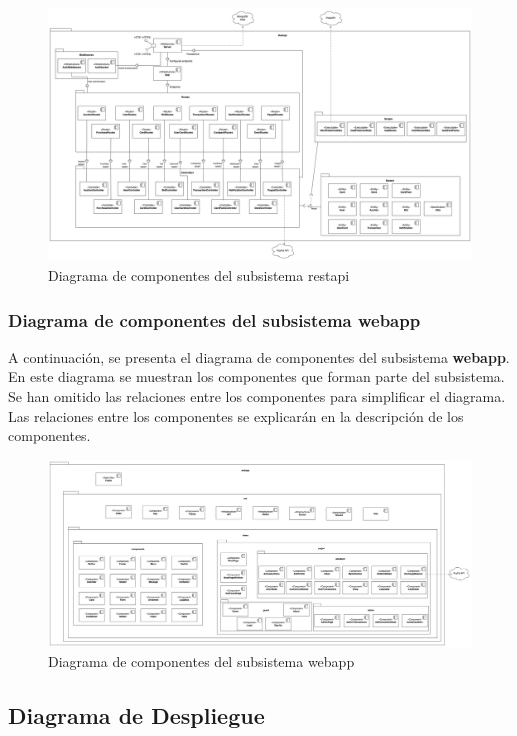     \begin{landscape}
    \begin{figure}[H]
        \hypertarget{fig:6_5_Diagrama-Componentes-restapi}{}
        \centering
        \includegraphics[width=1\linewidth]{figures/6-Analisis/6-Clases/6_5-Componentes-restapi.png}
        \caption{Diagrama de componentes del subsistema restapi}
        \label{fig:6_5_Diagrama-Componentes-restapi}
    \end{figure}
    \end{landscape}

\newpage




\subsubsection{Diagrama de componentes del subsistema webapp}
A continuación, se presenta el diagrama de componentes del subsistema \textbf{webapp}. En este diagrama se muestran los componentes que forman parte del subsistema.
Se han omitido las relaciones entre los componentes para simplificar el diagrama. Las relaciones entre los componentes se explicarán en la descripción de los componentes.
\begin{landscape}
    \begin{figure}[H]
        \hypertarget{fig:6_5_Diagrama-Componentes-webapp}{}
        \centering
        \includegraphics[width=1\linewidth]{figures/6-Analisis/6-Clases/6_5-Componentes-webapp.png}
        \caption{Diagrama de componentes del subsistema webapp}
        \label{fig:6_5_Diagrama-Componentes-webapp}
    \end{figure}
    \end{landscape}

\newpage



\subsection{Diagrama de Despliegue}
